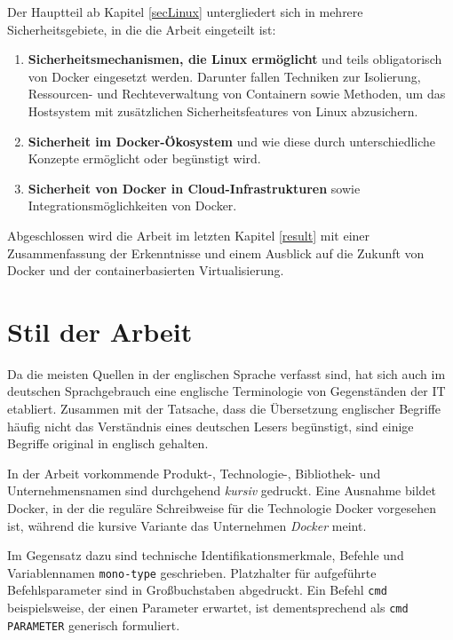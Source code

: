 \documentclass[../main.tex]{subfiles}
\begin{document}
    Der Hauptteil ab Kapitel \ref{secLinux} untergliedert sich in mehrere Sicherheitsgebiete, in die die Arbeit eingeteilt ist:
    \begin{enumerate}
      \item \textbf{Sicherheitsmechanismen, die Linux ermöglicht} und teils obligatorisch von Docker eingesetzt werden. Darunter fallen Techniken zur Isolierung, Ressourcen- und Rechteverwaltung von Containern sowie Methoden, um das Hostsystem mit zusätzlichen Sicherheitsfeatures von Linux abzusichern.
      \item \textbf{Sicherheit im Docker-Ökosystem} und wie diese durch unterschiedliche Konzepte ermöglicht oder begünstigt wird.
      \item \textbf{Sicherheit von Docker in Cloud-Infrastrukturen} sowie Integrationsmöglichkeiten von Docker.
    \end{enumerate}

    Abgeschlossen wird die Arbeit im letzten Kapitel \ref{result} mit einer Zusammenfassung der Erkenntnisse und einem Ausblick auf die Zukunft von Docker und der containerbasierten Virtualisierung.

  \section{Stil der Arbeit}
    Da die meisten Quellen in der englischen Sprache verfasst sind, hat sich auch im deutschen Sprachgebrauch eine englische Terminologie von Gegenständen der IT etabliert. Zusammen mit der Tatsache, dass die Übersetzung englischer Begriffe häufig nicht das Verständnis eines deutschen Lesers begünstigt, sind einige Begriffe original in englisch gehalten.

    In der Arbeit vorkommende Produkt-, Technologie-, Bibliothek- und Unternehmensnamen sind durchgehend \emph{kursiv} gedruckt. Eine Ausnahme bildet Docker, in der die reguläre Schreibweise für die Technologie Docker vorgesehen ist, während die kursive Variante das Unternehmen \emph{Docker} meint.

    Im Gegensatz dazu sind technische Identifikationsmerkmale, Befehle und Variablennamen \texttt{mono-type} geschrieben. Platzhalter für aufgeführte Befehlsparameter sind in Großbuchstaben abgedruckt. Ein Befehl \texttt{cmd} beispielsweise, der einen Parameter erwartet, ist dementsprechend als \texttt{cmd PARAMETER} generisch formuliert.
\end{document}
